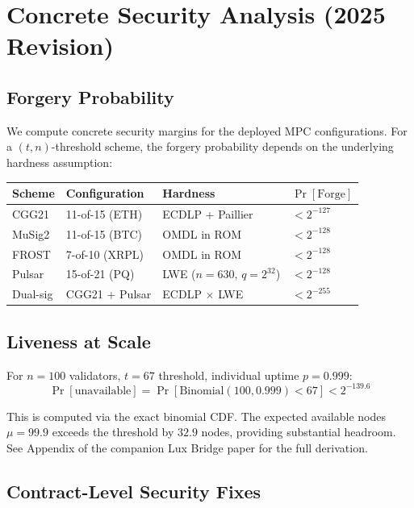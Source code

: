 \section{Concrete Security Analysis (2025 Revision)}


\subsection{Forgery Probability}

We compute concrete security margins for the deployed MPC configurations. For a $(t, n)$-threshold scheme, the forgery probability depends on the underlying hardness assumption:

\begin{table}[h]
\centering
\begin{tabular}{@{}llll@{}}
\toprule
\textbf{Scheme} & \textbf{Configuration} & \textbf{Hardness} & \textbf{$\Pr[\text{Forge}]$} \\
\midrule
CGG21 & 11-of-15 (ETH) & ECDLP + Paillier & $< 2^{-127}$ \\
MuSig2 & 11-of-15 (BTC) & OMDL in ROM & $< 2^{-128}$ \\
FROST & 7-of-10 (XRPL) & OMDL in ROM & $< 2^{-128}$ \\
Pulsar & 15-of-21 (PQ) & LWE ($n=630$, $q=2^{32}$) & $< 2^{-128}$ \\
Dual-sig & CGG21 + Pulsar & ECDLP $\times$ LWE & $< 2^{-255}$ \\
\bottomrule
\end{tabular}

\label{tab:concrete-security}
\end{table}

\subsection{Liveness at Scale}

For $n = 100$ validators, $t = 67$ threshold, individual uptime $p = 0.999$:
\begin{equation}
\Pr[\text{unavailable}] = \Pr[\text{Binomial}(100, 0.999) < 67] < 2^{-139.6}
\end{equation}

This is computed via the exact binomial CDF. The expected available nodes $\mu = 99.9$ exceeds the threshold by $32.9$ nodes, providing substantial headroom. See Appendix of the companion Lux Bridge paper \cite{lux-bridge-2025} for the full derivation.

\subsection{Contract-Level Security Fixes}


